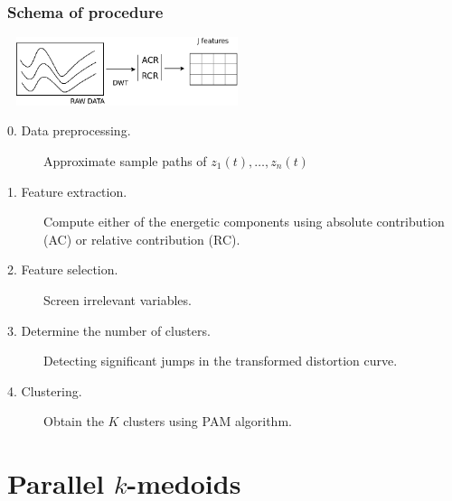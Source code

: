 \documentclass[xcolor=dvipsnames, smaller]{beamer}
\begin{document}
\begin{frame} 
  \frametitle{Schema of procedure}
  \begin{center}
   \includegraphics[width = 7cm, height = 2cm]{./pics/Diagramme1.png}
  \end{center}
      
        \begin{footnotesize}
\begin{description}
 \item [0. Data preprocessing.] Approximate sample paths of $z_1(t),\ldots,z_n(t)$ %
 \item [1. Feature extraction.] Compute either of the energetic components using absolute contribution (AC) or relative contribution (RC).
 \item [2. Feature selection.] Screen irrelevant variables. \begin{tiny} \end{tiny}
 \item [3. Determine the number of clusters.] Detecting significant jumps in the transformed distortion curve.
 \begin{tiny} \end{tiny}
 \item [4. Clustering.] Obtain the $K$ clusters using PAM algorithm.
\end{description}       \end{footnotesize}
    
    
\end{frame}


\section{Parallel $k$-medoids}
\end{document}
